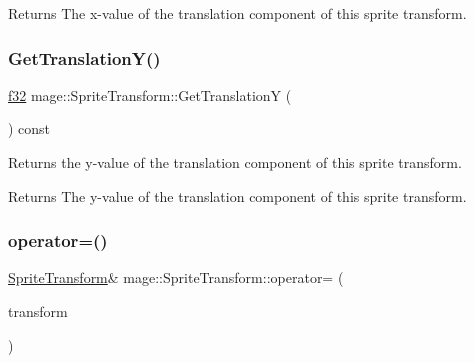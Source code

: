 \begin{DoxyReturn}{Returns}
The x-\/value of the translation component of this sprite transform. 
\end{DoxyReturn}
\hypertarget{structmage_1_1_sprite_transform_ae88818791dbced7d4ca771f0d0bd53cd}{}\label{structmage_1_1_sprite_transform_ae88818791dbced7d4ca771f0d0bd53cd} 
\subsubsection{\texorpdfstring{Get\+Translation\+Y()}{GetTranslationY()}}
{\footnotesize\ttfamily \hyperlink{namespacemage_a6a44ad388483959dc4dff9f2aef91431}{f32} mage\+::\+Sprite\+Transform\+::\+Get\+TranslationY (\begin{DoxyParamCaption}{ }\end{DoxyParamCaption}) const\hspace{0.3cm}{\ttfamily [noexcept]}}

Returns the y-\/value of the translation component of this sprite transform.

\begin{DoxyReturn}{Returns}
The y-\/value of the translation component of this sprite transform. 
\end{DoxyReturn}
\hypertarget{structmage_1_1_sprite_transform_af0adccff92d48e7b347e66277981ee07}{}\label{structmage_1_1_sprite_transform_af0adccff92d48e7b347e66277981ee07} 
\subsubsection{\texorpdfstring{operator=()}{operator=()}\hspace{0.1cm}{\footnotesize\ttfamily [1/2]}}
{\footnotesize\ttfamily \hyperlink{structmage_1_1_sprite_transform}{Sprite\+Transform}\& mage\+::\+Sprite\+Transform\+::operator= (\begin{DoxyParamCaption}\item[{const \hyperlink{structmage_1_1_sprite_transform}{Sprite\+Transform} \&}]{transform }\end{DoxyParamCaption})\hspace{0.3cm}{\ttfamily [default]}}

